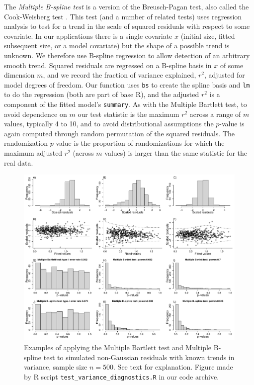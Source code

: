 \documentclass[12pt]{article}
\begin{document}
The \emph{Multiple B-spline test} is a version of the Breusch-Pagan test, also called the Cook-Weisberg test \citep{fox-weisberg-2018}. 
This test (and a number of related tests) uses regression analysis to test for a trend in the scale of squared residuals with respect to some covariate. 
In our applications there is a single covariate $x$ (initial size, fitted subsequent size, or a model covariate) but the shape of a possible trend is unknown.  
We therefore use B-spline regression to allow detection of an arbitrary smooth trend. 
Squared residuals are regressed on a B-spline basis in $x$ of some dimension $m$, and we record the fraction of variance explained, $r^2$, adjusted for model degrees of freedom.
Our function uses \texttt{bs} to create the spline basis and \texttt{lm} to do the regression (both are part of base R), and the adjusted $r^2$ is a component of the fitted model's \texttt{summary}.  
As with the Multiple Bartlett test, to avoid dependence on $m$ our test statistic is the maximum $r^2$ across a range of $m$ values, typically 4 to 10, and to avoid distributional assumptions the $p$-value is again computed through random permutation of the squared residuals. 
The randomization $p$ value is the proportion of randomizations for which the maximum adjusted $r^2$ (across $m$ values) is 
larger than the same statistic for the real data.  

\begin{figure}[tbp]
\centering
\includegraphics[width=\textwidth]{figures/test_variance_diagnostics_500.pdf}
\caption{Examples of applying the Multiple Bartlett test and Multiple B-spline test to simulated non-Gaussian residuals with known trends in variance, sample size $n=500$. 
See text for explanation. Figure made by R script \texttt{test\_variance\_diagnostics.R} in our code archive. }
\label{fig:ncv}
\end{figure} 
\end{document}
